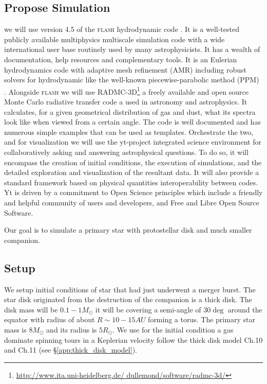 \documentclass[a4paper,12pt,modern]{aastex62}
\begin{document}
\subsection{Propose Simulation}
we will use version 4.5 of the \textsc{flash} hydrodynamic code \cite{2000ApJS..131..273F}. It is a well-tested publicly available multiphysics multiscale simulation code with a wide international user base routinely used by many astrophysicists. It has a wealth of documentation, help resources and complementary tools. It is an Eulerian hydrodynamics code with adaptive mesh refinement (AMR) including robust solvers for hydrodynamic like the well-known piecewise-parabolic method (PPM) \cite{1984JCoPh..54..174C}. Alongside \textsc{flash} we will use RADMC-3D\footnote{\url{http://www.ita.uni-heidelberg.de/ dullemond/software/radmc-3d/}} \cite{2012ascl.soft02015D} a freely available and open source Monte Carlo radiative transfer code a used in astronomy and astrophysics. It calculates, for a given geometrical distribution of gas and dust, what its spectra look like when viewed from a certain angle. The code is well documented and has numerous simple examples that can be used as templates. Orchestrate the two, and for visualization we will use the yt-project \cite{2011ApJS..192....9T} integrated science environment for collaboratively asking and answering astrophysical questions. To do so, it will encompass the creation of initial conditions, the execution of simulations, and the detailed exploration and visualization of the resultant data. It will also provide a standard framework based on physical quantities interoperability between codes. Yt is driven by a commitment to Open Science principles which include a friendly and helpful community of users and developers, and Free and Libre Open Source Software.

Our goal is to simulate a primary star with protostellar disk and much smaller companion.

\subsection{Setup}
\label{sec:setup}
We setup initial conditions of star that had just underwent a merger burst.
The star disk originated from the destruction of the companion is a thick disk.
The disk mass will be $0.1-1 M_\odot$ it will be covering a semi-angle of $30 \deg$ around the equator with radius of about  $R\sim10-15 AU$ forming a torus.
The primary star mass is $8 M_\odot$ and its radius is $5 R_\odot$.
We use for the initial condition a gas dominate spinning tours in a Keplerian velocity follow the thick disk model \cite{ 2002apa..book.....F} Ch.10 and Ch.11 (see \S\ref{app:thick_disk_model}).
\end{document}
